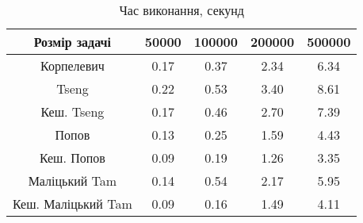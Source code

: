 \begin{table}[H]
	\centering
	\begin{tabular}{|c||c|c|c|c|}\hline
		Розмір задачі & 50000 & 100000 & 200000 & 500000 \\ \hline \hline
		Корпелевич & 0.17 & 0.37 & 2.34 & 6.34 \\ \hline
		Tseng & 0.22 & 0.53 & 3.40 & 8.61 \\ \hline
		Кеш. Tseng & 0.17 & 0.46 & 2.70 & 7.39 \\ \hline
		Попов & 0.13 & 0.25 & 1.59 & 4.43 \\ \hline
		Кеш. Попов & 0.09 & 0.19 & 1.26 & 3.35 \\ \hline
		Маліцький Tam & 0.14 & 0.54 & 2.17 & 5.95 \\ \hline
		Кеш. Маліцький Tam & 0.09 & 0.16 & 1.49 & 4.11 \\ \hline
	\end{tabular}
	\caption{Час виконання, секунд}
\end{table}
